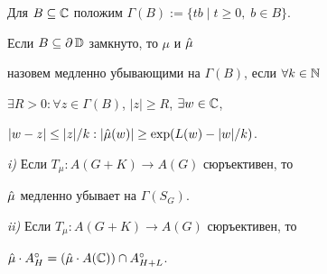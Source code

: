 Для $B\subseteq\Bbb C$ положим $\Gamma(B):=\{tb\mid t\ge 0,\;b\in B\}$. 


 


\begin{defn} Если $B\subseteq\partial\,\Bbb D$ замкнуто, то $\mu$ и $\Hat\mu$ 


назовем медленно убывающими на $\Gamma(B)$, если $\forall k\in\Bbb N$ 


$\exists R>0:\forall z\in\Gamma(B)$, $|z|\ge R$, $\exists w\in\Bbb C$, 


$|w-z|\le|z|/k:|\Hat\mu(w)|\ge\exp(L(w)-|w|/k)$. 


\end{defn}


 


\begin{lem} {\em i)} Если $T_\mu :A(G+K)\to A(G)$ сюръективен, то 


$\Hat\mu$ медленно убывает на $\Gamma(S_G)$. 


 


{\em ii)} Если $T_\mu :A(G+K)\to A(G)$ сюръективен, то 


$\Hat\mu\cdot A^\circ_H=(\Hat\mu\cdot A(\Bbb C))\cap A^\circ_{H+L}$. 


\end{lem} 


 


